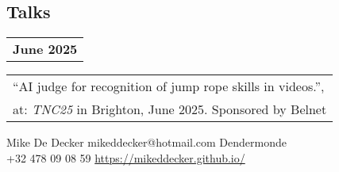 \documentclass[grey]{hipstercv}
\newlength{\rightcolwidth}
\begin{document}
\begin{paracol}{2}
\begin{minipage}[t]{0.29\rightcolwidth}
\section*{Talks}
\begin{tabular}{@{}>{\footnotesize\bfseries}r @{}}
June 2025 \\[0.5ex]
\end{tabular}
\begin{tabular}{@{}p{0.29\rightcolwidth}@{}}
``AI judge for recognition of jump rope skills in videos.'', \\
at: \emph{TNC25} in Brighton, June 2025. Sponsored by Belnet \\
\end{tabular}
\end{minipage}\hfill


\begin{minipage}[t]{0.48\rightcolwidth}
\end{minipage}







\vfill{} %

\setlength{\parindent}{0pt}
\begin{minipage}[t]{\rightcolwidth}
\begin{center}\fontfamily{\sfdefault}\selectfont \color{black!70}
{
    \small Mike De Decker  mikeddecker@hotmail.com 
    Dendermonde \\  +32 478 09 08 59
     \protect\url{https://mikeddecker.github.io/}
}
\end{center}
\end{minipage}


\end{paracol}
\end{document}
